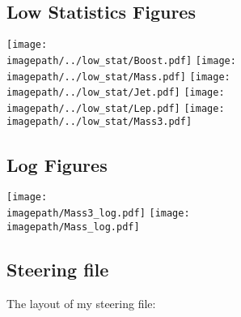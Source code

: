 \subsection{Low Statistics Figures}
\label{App:LowStatisticsFigures}
\texttt{[image: \\imagepath/../low\_stat/Boost.pdf]}
\texttt{[image: \\imagepath/../low\_stat/Mass.pdf]}
\texttt{[image: \\imagepath/../low\_stat/Jet.pdf]}
\texttt{[image: \\imagepath/../low\_stat/Lep.pdf]}
\texttt{[image: \\imagepath/../low\_stat/Mass3.pdf]}
\subsection{Log Figures}
\label{App:LogFigures}
\texttt{[image: \\imagepath/Mass3\_log.pdf]}
\texttt{[image: \\imagepath/Mass\_log.pdf]}

\subsection{Steering file}
\label{App:SteeringFile}

The layout of my steering file:

